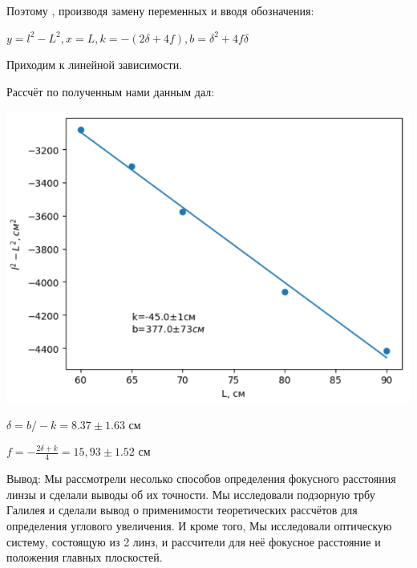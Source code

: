 \documentclass{article}
\begin{document}
Поэтому , производя замену переменных и вводя обозначения:

$y = l^2 - L^2 , x = L, k = -(2\delta+4f), b = \delta^2 + 4f\delta$

Приходим к линейной зависимости.

Рассчёт по полученным нами данным дал:

    \includegraphics[width=0.5\linewidth]{Снимок экрана от 2024-05-10 13-19-14.png}

\begin{center}
    $\delta = b / -k = 8.37 \pm 1.63$ см

    $f = -\frac{2\delta + k}{4} = 15,93 \pm 1.52$ см
\end{center}

Вывод: Мы рассмотрели несолько способов определения фокусного расстояния линзы и сделали выводы об их точности. Мы исследовали подзорную трбу Галилея и сделали вывод о применимости теоретических рассчётов для определения углового увеличения. И кроме того, Мы исследовали оптическую систему, состоящую из 2 линз, и рассчители для неё фокусное расстояние и положения главных плоскостей.
\end{document}
